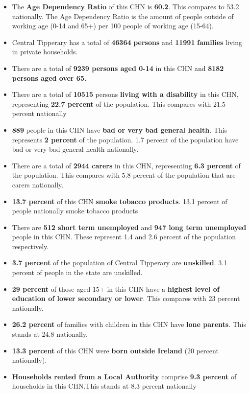 \documentclass{article}
\begin{document}
\begin{itemize}

\item The \textbf{Age Dependency Ratio} of this CHN is  \textbf{60.2}. This compares to 53.2 nationally. The Age Dependency Ratio is the amount of people outside of working age (0-14 and 65+) per 100 people of working age (15-64). 

\item Central Tipperary has a total of \textbf{\num{46364}} \textbf{persons} and  \textbf{\num{11991}} \textbf{families} living in private households.

\item There are a total of \textbf{\num{9239} persons aged 0-14} in this CHN and \textbf{\num{8182} persons aged over 65.} 

\item There are a total of \textbf{\num{10515}} persons \textbf{living with a disability} in this CHN, representing \textbf{22.7 percent} of the population. This compares with  21.5 percent nationally

\item \textbf{\num{889}} people in this CHN have \textbf{bad or very bad general health}. This represents \textbf{2 percent} of the population. 1.7 percent of the population have bad or very bad general health nationally. 

\item There are a total of \textbf{\num{2944} carers} in this CHN, representing \textbf{6.3 percent} of the population. This compares with 5.8 percent of the population that are carers nationally. 

\item \textbf{13.7 percent} of this CHN \textbf{smoke tobacco products}. 13.1 percent of people nationally smoke tobacco products

\item There are \textbf{\num{512} short term unemployed} and \textbf{\num{947} long term unemployed} people in this CHN. These represent 1.4 and 2.6 percent of the population respectively.

\item  \textbf{3.7 percent} of the population of Central Tipperary are \textbf{unskilled}. 3.1 percent of people in the state are unskilled.

\item \textbf{29 percent} of those aged 15+ in this CHN have a \textbf{highest level of education of lower secondary or lower}. This compares with 23 percent nationally. 

\item \textbf{26.2 percent} of families with children in this CHN have \textbf{lone parents}. This stands at 24.8 nationally.

\item \textbf{13.3 percent} of this CHN were \textbf{born outside Ireland} (20 percent nationally).

\item \textbf{Households rented from a Local Authority} comprise \textbf{9.3 percent} of households in this CHN.This stands at 8.3 percent nationally

\end{itemize}
\end{document}
